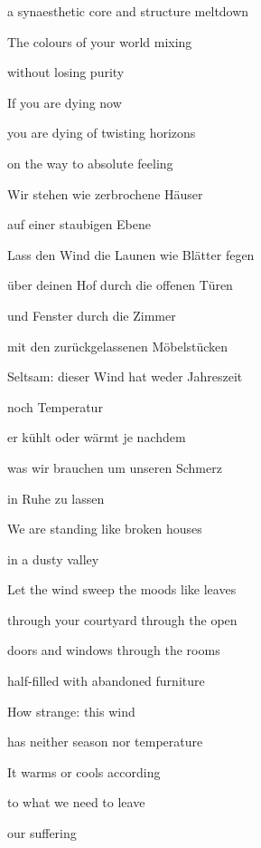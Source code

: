a synaesthetic core and structure meltdown

The colours of your world mixing

without losing purity

If you are dying now

you are dying of twisting horizons

on the way to absolute feeling


\bigskip


\bigskip



\bigskip

Wir stehen wie zerbrochene Häuser

auf einer staubigen Ebene

Lass den Wind die Launen wie Blätter fegen


\bigskip

über deinen Hof durch die offenen Türen 

und Fenster durch die Zimmer 

mit den zurückgelassenen Möbelstücken


\bigskip

Seltsam: dieser Wind hat weder Jahreszeit 

noch Temperatur 

er kühlt oder wärmt je nachdem


\bigskip

was wir brauchen um unseren Schmerz 

in Ruhe zu lassen


\bigskip



\bigskip

We are standing like broken houses

in a dusty valley

Let the wind sweep the moods like leaves

through your courtyard through the open

doors and windows through the rooms

half-filled with abandoned furniture


\bigskip

How strange: this wind

has neither season nor temperature

It warms or cools according

to what we need to leave

our suffering

